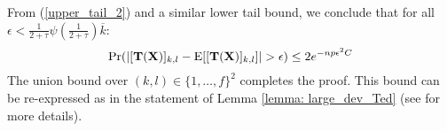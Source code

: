 \begin{IEEEproof}

	From (\ref{upper_tail_2}) and a similar lower tail bound, we conclude that for all $\epsilon<\frac{1}{2+\tau} \psi(\frac{1}{2+\tau}) \overline{k}$:
	\begin{equation*} 
			\Pr(|[\bT(\bX)]_{k,l}-\E[[\bT(\bX)]_{k,l}]|>\epsilon) \leq 2 e^{-np\epsilon^2 C}
	\end{equation*}
	The union bound over $(k,l)\in \{1,\dots,f\}^2$ completes the proof. This bound can be re-expressed as in the statement of Lemma \ref{lemma: large_dev_Ted} (see \cite{TsiligkaridisTSP} for more details).
\end{IEEEproof}
